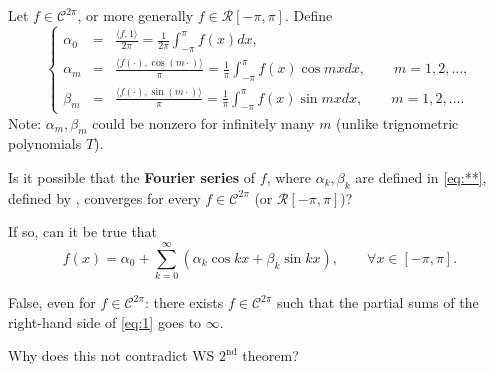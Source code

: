 \documentclass[letterpaper, reqno,11pt]{article}
\begin{document}
\begin{defn}
  \normalfont Let $f \in \mathcal C^{2\pi}$, or more generally $f \in \mathcal R[-\pi, \pi]$. Define
  \begin{equation} \label{eq:**} \tag{**}
    \left\{
    \begin{array}{lcl}
      \alpha_0 &=& \frac{\langle f, 1 \rangle}{2\pi} = \frac{1}{2\pi} \int_{-\pi}^\pi f(x) dx, \\
      \alpha_m &=& \frac{\langle f(\cdot), \cos(m \cdot) \rangle}{\pi} = \frac{1}{\pi} \int_{-\pi}^\pi f(x) \cos mx dx, \qquad m = 1, 2, \ldots, \\
      \beta_m &=& \frac{\langle f(\cdot), \sin(m \cdot) \rangle}{\pi} = \frac{1}{\pi} \int_{-\pi}^\pi f(x) \sin mx dx, \qquad m = 1, 2, \ldots.
    \end{array}
    \right.
  \end{equation}
  Note: $\alpha_m, \beta_m$ could be nonzero for infinitely many $m$ (unlike trignometric polynomials $T$).
\end{defn}

 Is it possible that the {\bf Fourier series} of $f$, where $\alpha_k, \beta_k$ are defined in \eqref{eq:**}, defined by , converges for every $f \in \mathcal C^{2\pi}$ (or $\mathcal R[-\pi, \pi]$)?

If so, can it be true that
\begin{equation} \label{eq:1}
  f(x) = \alpha_0 + \sum_{k = 0}^\infty (\alpha_k \cos kx + \beta_k \sin kx), \qquad \forall x \in [-\pi, \pi].
\end{equation}

\begin{remark}
  \normalfont False, even for $f \in \mathcal C^{2\pi}$: there exists $f \in \mathcal C^{2\pi}$ such that the partial sums of the right-hand side of \eqref{eq:1} goes to $\infty$.

  Why does this not contradict WS $2^\text{nd}$ theorem?
\end{remark}
\end{document}

